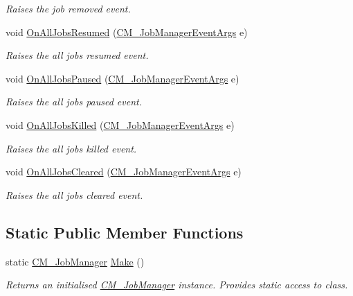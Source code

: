 \begin{DoxyCompactItemize}
\begin{DoxyCompactList}\small\item\em Raises the job removed event. \end{DoxyCompactList}\item 
void \hyperlink{class_c_m___job_manager_ae6f76e1db2269e63506ad70d063e6fd0}{On\+All\+Jobs\+Resumed} (\hyperlink{class_c_m___job_manager_event_args}{C\+M\+\_\+\+Job\+Manager\+Event\+Args} e)
\begin{DoxyCompactList}\small\item\em Raises the all jobs resumed event. \end{DoxyCompactList}\item 
void \hyperlink{class_c_m___job_manager_ae666d35da523c26313933b7b9c9ca244}{On\+All\+Jobs\+Paused} (\hyperlink{class_c_m___job_manager_event_args}{C\+M\+\_\+\+Job\+Manager\+Event\+Args} e)
\begin{DoxyCompactList}\small\item\em Raises the all jobs paused event. \end{DoxyCompactList}\item 
void \hyperlink{class_c_m___job_manager_a8aafc682e991a7b2c8cf056292243db8}{On\+All\+Jobs\+Killed} (\hyperlink{class_c_m___job_manager_event_args}{C\+M\+\_\+\+Job\+Manager\+Event\+Args} e)
\begin{DoxyCompactList}\small\item\em Raises the all jobs killed event. \end{DoxyCompactList}\item 
void \hyperlink{class_c_m___job_manager_ab7c334ef31635981f63460e5f8b270bf}{On\+All\+Jobs\+Cleared} (\hyperlink{class_c_m___job_manager_event_args}{C\+M\+\_\+\+Job\+Manager\+Event\+Args} e)
\begin{DoxyCompactList}\small\item\em Raises the all jobs cleared event. \end{DoxyCompactList}\end{DoxyCompactItemize}
\subsection*{Static Public Member Functions}
\begin{DoxyCompactItemize}
\item 
static \hyperlink{class_c_m___job_manager}{C\+M\+\_\+\+Job\+Manager} \hyperlink{class_c_m___job_manager_a404b217320793549dca8cd2c5914c608}{Make} ()
\begin{DoxyCompactList}\small\item\em Returns an initialised \hyperlink{class_c_m___job_manager}{C\+M\+\_\+\+Job\+Manager} instance. Provides static access to class. \end{DoxyCompactList}\end{DoxyCompactItemize}
